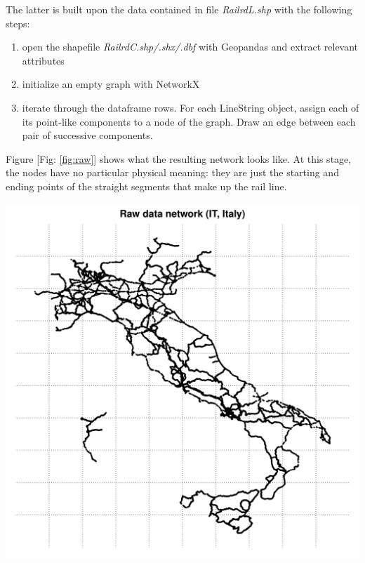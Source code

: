 The latter is built upon the data contained in file \textit{RailrdL.shp} with the following steps:
\newline \noindent
\begin{minipage}{0.5\textwidth}
\begin{enumerate}
    \item open the shapefile \textit{RailrdC.shp/.shx/.dbf} with Geopandas and extract relevant attributes
     \item initialize an empty graph with NetworkX
     \item iterate through the dataframe rows. For each LineString object, assign each of its point-like components to a node of the graph. Draw an edge between each pair of successive components.
\end{enumerate}
Figure [Fig: \ref{fig:raw}] shows what the resulting network looks like. At this stage, the nodes have no particular physical meaning: they are just the starting and ending points of the straight segments that make up the rail line.
\end{minipage}
\hfill
\begin{minipage}{0.48\textwidth}
    \includegraphics[width = \textwidth]{latex_source/images/railways/raw_networks/raw_IT_network.pdf}
    \label{fig:raw}
\end{minipage}
